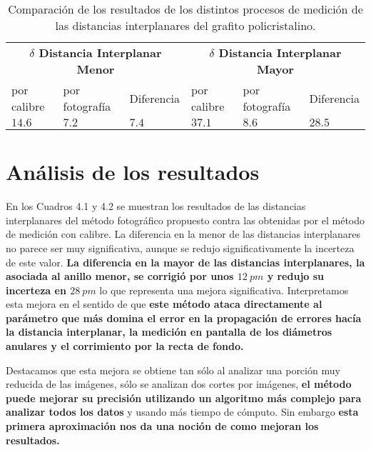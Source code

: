 \documentclass[a4paper, 10pt, spanish]{article}
\numberwithin{equation}{section}
\numberwithin{table}{section}
\begin{document}
\begin{table}[ht]
\centering
\begin{tabularx}{0.94\textwidth}{XXXXXX}
\toprule   
 \multicolumn{3}{c}{\textbf{$\delta$ Distancia Interplanar Menor}}  & \multicolumn{3}{c}{\textbf{ $\delta$ Distancia Interplanar Mayor}}  \\
 \cmidrule(r){1-3}  \cmidrule(r){4-6} 
  por calibre           & por fotografía  & Diferencia      & por calibre   & por fotografía  &Diferencia     \\ 
\cmidrule(r){1-1}     \cmidrule(r){2-2}     \cmidrule(r){3-3} \cmidrule(r){4-4}  \cmidrule(r){5-5} \cmidrule(r){6-6}  
 $14.6 $& $7.2$  & $7.4$                              & $37.1$          &  $8.6$ & $28.5$                                \\  \hline
\bottomrule
\end{tabularx}
\caption{Comparación de los resultados de los distintos procesos de medición de las distancias interplanares del grafito policristalino.} 
\label{tab:sim_b_2}
\end{table}

\section{Análisis de los resultados}
En los Cuadros 4.1 y 4.2 se muestran los resultados de las distancias interplanares del método fotográfico propuesto contra las obtenidas por el método de medición con calibre. La diferencia en la menor de las distancias interplanares no parece ser muy significativa, aunque se redujo significativamente la incerteza de este valor. \textbf{La diferencia en la mayor de las distancias interplanares, la asociada al anillo menor, se corrigió por unos $12\ pm$ y redujo su incerteza en $28\ pm$} lo que representa una mejora significativa. Interpretamos esta mejora en el sentido de que \textbf{este método ataca directamente al parámetro que más domina el error en la propagación de errores hacía la distancia interplanar, la medición en pantalla de los diámetros anulares y el corrimiento por la recta de fondo.}

Destacamos que esta mejora se obtiene tan sólo al analizar una porción muy reducida de las imágenes, sólo se analizan dos cortes por imágenes, \textbf{el método puede mejorar su precisión utilizando un algoritmo más complejo para analizar todos los datos} y usando más tiempo de cómputo. Sin embargo \textbf{esta primera aproximación nos da una noción de como mejoran los resultados.}
\end{document}
